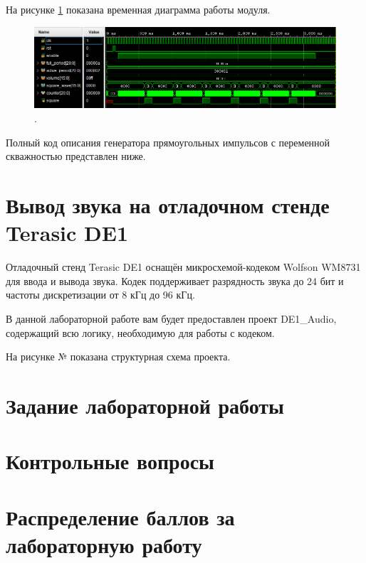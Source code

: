 На рисунке \ref{lab7:pic6} показана временная диаграмма работы модуля.

\begin{figure}[H]
	\centering
	\includegraphics [width=1\textwidth] {images/lab_7/square_simulate2.PNG}
	\caption{.}
	\label{lab7:pic6}
\end{figure}

Полный код описания генератора прямоугольных импульсов с переменной скважностью представлен ниже.


\noindent
\begin{minipage}{\linewidth}
	
\end{minipage}



\section{Вывод звука на отладочном стенде Terasic DE1}

Отладочный стенд Terasic DE1 оснащён микросхемой-кодеком Wolfson WM8731 для ввода и вывода звука. Кодек поддерживает разрядность звука до 24 бит и частоты дискретизации от 8 кГц до 96 кГц.


В данной лабораторной работе вам будет предоставлен проект DE1\_Audio, содержащий всю логику, необходимую для работы с кодеком.

На рисунке № показана структурная схема проекта.

\section{Задание лабораторной работы}


\section{Контрольные вопросы}


\section{Распределение баллов за лабораторную работу}